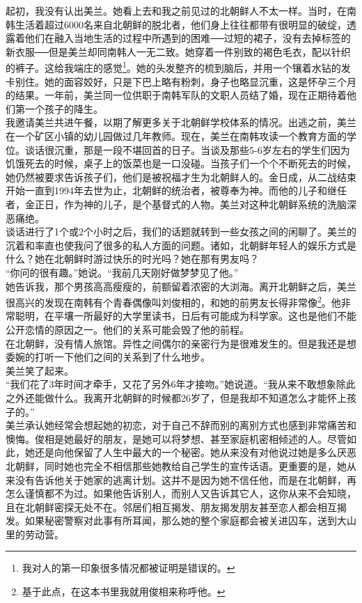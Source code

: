 起初，我没有认出美兰。她看上去和我之前见过的北朝鲜人不太一样。当时，在南韩生活着超过6000名来自北朝鲜的脱北者，他们身上往往都带有很明显的破绽，透露着他们在融入当地生活的过程中所遇到的困难──过短的裙子，没有去掉标签的新衣服──但是美兰却同南韩人一无二致。她穿着一件别致的褐色毛衣，配以针织的裤子。这给我端庄的感觉\footnote{我对人的第一印象很多情况都被证明是错误的。}。她的头发整齐的梳到脑后，并用一个镶着水钻的发卡别住。她的面容姣好，只是下巴上略有粉刺，身子也略显沉重，这是怀孕三个月的结果。一年前，美兰同一位供职于南韩军队的文职人员结了婚，现在正期待着他们第一个孩子的降生。\\

我邀请美兰共进午餐，以期了解更多关于北朝鲜学校体系的情况。出逃之前，美兰在一个矿区小镇的幼儿园做过几年教师。现在，美兰在南韩攻读一个教育方面的学位。谈话很沉重，那是一段不堪回首的日子。当谈及那些5-6岁左右的学生们因为饥饿死去的时候，桌子上的饭菜也是一口没碰。当孩子们一个个不断死去的时候，她仍然被要求告诉孩子们，他们是被祝福才生为北朝鲜人的。金日成，从二战结束开始一直到1994年去世为止，北朝鲜的统治者，被尊奉为神。而他的儿子和继任者，金正日，作为神的儿子，是个基督式的人物。美兰对这种北朝鲜系统的洗脑深恶痛绝。\\

谈话进行了1个或2个小时之后，我们的话题就转到一些女孩之间的闲聊了。美兰的沉着和率直也使我问了很多的私人方面的问题。诸如，北朝鲜年轻人的娱乐方式是什么？她在北朝鲜时游过快乐的时光吗？她在那有男友吗？\\

“你问的很有趣。”她说。“我前几天刚好做梦梦见了他。”\\

她告诉我，那个男孩高高瘦瘦的，前额留着浓密的大浏海。离开北朝鲜之后，美兰很高兴的发现在南韩有个青春偶像叫刘俊相的，和她的前男友长得非常像\footnote{基于此点，在这本书里我就用俊相来称呼他。}。他非常聪明，在平壤一所最好的大学里读书，日后有可能成为科学家。这也是他们不能公开恋情的原因之一。他们的关系可能会毁了他的前程。\\

在北朝鲜，没有情人旅馆。异性之间偶尔的亲密行为是很难发生的。但是我还是想委婉的打听一下他们之间的关系到了什么地步。\\

美兰笑了起来。\\

“我们花了3年时间才牵手，又花了另外6年才接吻。”她说道。“我从来不敢想象除此之外还能做什么。我离开北朝鲜的时候都26岁了，但是我却不知道怎么才能怀上孩子的。”\\

美兰承认她经常会想起她的初恋，对于自己不辞而别的离别方式也感到非常痛苦和懊悔。俊相是她最好的朋友，是她可以将梦想、甚至家庭机密相倾述的人。尽管如此，她还是向他保留了人生中最大的一个秘密。她从来没有对他说过她是多么厌恶北朝鲜，同时她也完全不相信那些她教给自己学生的宣传话语。更重要的是，她从来没有告诉他关于她家的逃离计划。这并不是因为她不信任他，而是在北朝鲜，再怎么谨慎都不为过。如果他告诉别人，而别人又告诉其它人，这你从来不会知晓，且在北朝鲜密探无处不在。邻居们相互揭发、朋友揭发朋友甚至恋人都会相互揭发。如果秘密警察对此事有所耳闻，那么她的整个家庭都会被关进囚车，送到大山里的劳动营。\\

